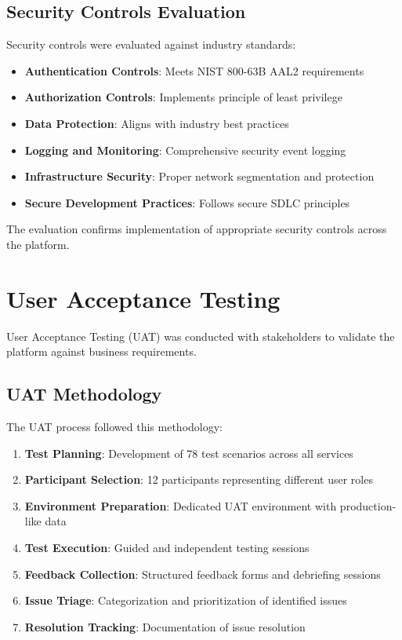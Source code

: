 \subsection{Security Controls Evaluation}

Security controls were evaluated against industry standards:

\begin{itemize}
    \item \textbf{Authentication Controls}: Meets NIST 800-63B AAL2 requirements
    \item \textbf{Authorization Controls}: Implements principle of least privilege
    \item \textbf{Data Protection}: Aligns with industry best practices
    \item \textbf{Logging and Monitoring}: Comprehensive security event logging
    \item \textbf{Infrastructure Security}: Proper network segmentation and protection
    \item \textbf{Secure Development Practices}: Follows secure SDLC principles
\end{itemize}

The evaluation confirms implementation of appropriate security controls across the platform.

\section{User Acceptance Testing}

User Acceptance Testing (UAT) was conducted with stakeholders to validate the platform against business requirements.

\subsection{UAT Methodology}

The UAT process followed this methodology:

\begin{enumerate}
    \item \textbf{Test Planning}: Development of 78 test scenarios across all services
    \item \textbf{Participant Selection}: 12 participants representing different user roles
    \item \textbf{Environment Preparation}: Dedicated UAT environment with production-like data
    \item \textbf{Test Execution}: Guided and independent testing sessions
    \item \textbf{Feedback Collection}: Structured feedback forms and debriefing sessions
    \item \textbf{Issue Triage}: Categorization and prioritization of identified issues
    \item \textbf{Resolution Tracking}: Documentation of issue resolution
\end{enumerate}

